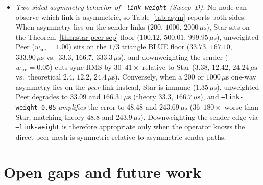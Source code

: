 \documentclass[11pt,a4paper]{article}
\theoremstyle{definition}
\begin{document}
\begin{itemize}
  $33\%$ ($5.16 \to 6.87{\times}10^{-4}\,\text{s}^{-2}$).
\item \emph{Two-sided asymmetry behavior of \texttt{--link-weight} (Sweep~D).}
  No node can observe which link is asymmetric, so Table~\ref{tab:asym} reports
  both sides. When asymmetry lies on the sender links ($200$, $1000$,
  $2000\,\mu\text{s}$), Star sits on the Theorem~\ref{thm:star-peer-sep} floor
  ($100.12$, $500.01$, $999.95\,\mu\text{s}$), unweighted Peer
  ($w_{\mathrm{src}} = 1.00$) sits on the $1/3$ triangle BLUE floor ($33.73$,
  $167.10$, $333.90\,\mu\text{s}$ vs.\ $33.3$, $166.7$, $333.3\,\mu\text{s}$),
  and downweighting the sender ($w_{\mathrm{src}} = 0.05$) cuts sync RMS by
  $30$--$41\times$ relative to Star ($3.38$, $12.42$, $24.24\,\mu\text{s}$ vs.\
  theoretical $2.4$, $12.2$, $24.4\,\mu\text{s}$). Conversely, when a
  $200$ or $1000\,\mu\text{s}$ one-way asymmetry lies on the \emph{peer} link
  instead, Star is immune ($1.35\,\mu\text{s}$), unweighted Peer degrades to
  $33.09$ and $166.31\,\mu\text{s}$ (theory $33.3$, $166.7\,\mu\text{s}$), and
  \texttt{--link-weight 0.05} \emph{amplifies} the error to $48.48$ and
  $243.69\,\mu\text{s}$ ($36$--$180\times$ worse than Star, matching theory
  $48.8$ and $243.9\,\mu\text{s}$). Downweighting the sender edge via
  \texttt{--link-weight} is therefore appropriate only when the operator knows
  the direct peer mesh is symmetric relative to asymmetric sender paths.
\end{itemize}

\section{Open gaps and future work}
\end{document}

